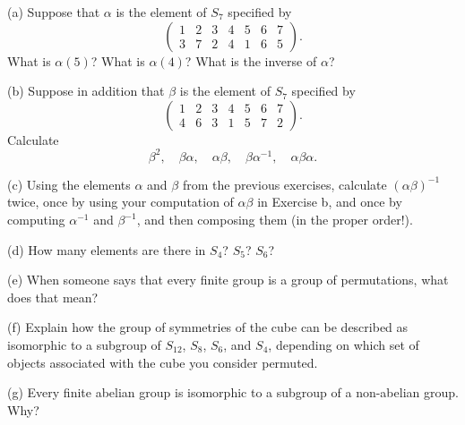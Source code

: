 \begin{problem}[Warmup]{(a)}
    Suppose that $\alpha$ is the element of $S_7$ specified by \[\begin{pmatrix} 1 & 2 & 3 & 4 & 5 & 6 & 7 \\ 3 & 7 & 2 & 4 & 1 & 6 & 5 \end{pmatrix}.\] What is $\alpha(5)$? What is $\alpha(4)$? What is the inverse of $\alpha$?
\end{problem}
\unsolved

\begin{problem}[Warmup]{(b)}
    Suppose in addition that $\beta$ is the element of $S_7$ specified by \[\begin{pmatrix} 1 & 2 & 3 & 4 & 5 & 6 & 7 \\ 4 & 6 & 3 & 1 & 5 & 7 & 2 \end{pmatrix}.\] Calculate \[\beta^2, \quad \beta\alpha, \quad \alpha\beta, \quad \beta\alpha^{-1}, \quad \alpha\beta\alpha.\]
\end{problem}
\unsolved

\begin{problem}[Warmup]{(c)}
    Using the elements $\alpha$ and $\beta$ from the previous exercises, calculate ${(\alpha\beta)}^{-1}$ twice, once by using your computation of $\alpha\beta$ in Exercise b, and once by computing $\alpha^{-1}$ and $\beta^{-1}$, and then composing them (in the proper order!).
\end{problem}
\unsolved

\begin{problem}[Warmup]{(d)}
    How many elements are there in $S_4$? $S_5$? $S_6$?
\end{problem}
\unsolved

\begin{problem}[Warmup]{(e)}
    When someone says that every finite group is a group of permutations, what does that mean?
\end{problem}
\unsolved

\begin{problem}[Warmup]{(f)}
    Explain how the group of symmetries of the cube can be described as isomorphic to a subgroup of $S_{12}$, $S_8$, $S_6$, and $S_4$, depending on which set of objects associated with the cube you consider permuted.
\end{problem}
\unsolved

\begin{problem}[Warmup]{(g)}
    Every finite abelian group is isomorphic to a subgroup of a non-abelian group. Why?
\end{problem}
\unsolved

